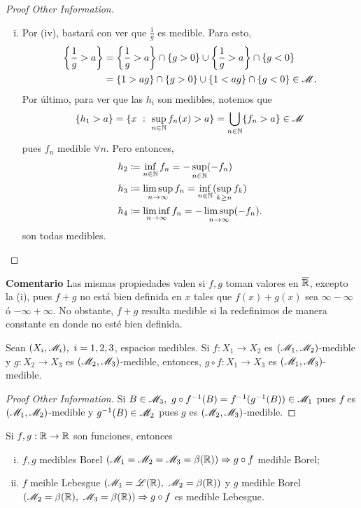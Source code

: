 \begin{proof}[Proof Other Information]
\begin{enumerate}[i)]
		\item Por (iv), bastará  con ver que $\frac{1}{g}$ es medible. Para esto,
		\begin{align*}
			\left\{\frac{1}{g} > a\right\} &= \left\{\frac{1}{g}>a\right\} \cap \{g>0\} \cup \left\{\frac{1}{g}>a\right\} \cap \{g<0\} \\
			&= \{1 > ag\} \cap \{g>0\} \cup \{1<ag\} \cap \{g<0\} \in \mathscr{M}
		.\end{align*}
		Por último, para ver que las $h_i$ son medibles, notemos que
		\[ \{h_{1}>a\} = \{x \ : \ \sup_{n\in\mathbb{N}} f_n(x) > a\} = \bigcup_{n\in\mathbb{N}} \{f_n > a\} \in \mathscr{M} \]
		pues $f_n$ medible $\forall n$. Pero entonces,
		\begin{align*}
			h_{2} &\coloneq \inf_{n\in\mathbb{N}} f_n = -\sup_{n\in\mathbb{N}}(-f_n) \\
			h_{3} &\coloneq \limsup_{n \to \infty} f_n = \inf_{n\in\mathbb{N}}(\sup_{k\geq n} f_k) \\
			h_{4} &\coloneq \liminf_{n \to \infty} f_n = -\limsup_{n \to \infty} (-f_n)
		.\end{align*}
		son todas medibles.
	\end{enumerate}
\end{proof}

\textbf{Comentario} Las mismas propiedades valen si $f,g$ toman valores en $\overline{\mathbb{R}}$, excepto la (i), pues $f+g$ no está bien definida en $x$ tales que $f(x) + g(x)$ sea $\infty-\infty$ ó $-\infty+\infty$. No obstante, $f+g$ resulta medible si la redefinimos de manera constante en donde no esté bien definida.

\begin{prop}
	Sean $(X_i, \mathscr{M}_i),\ i = 1,2,3$, espacios medibles. Si $f : X_{1} \to X_{2}$ es $(\mathscr{M}_{1}, \mathscr{M}_2)$-medible y $g : X_{2} \to X_{3}$ es $(\mathscr{M}_2, \mathscr{M}_3)$-medible, entonces, $g \circ f : X_{1} \to X_{3}$ es $(\mathscr{M}_1, \mathscr{M}_3)$-medible.
\end{prop}
\begin{proof}[Proof Other Information]
	Si $B \in \mathscr{M}_3,\ g \circ f^{-1}(B) = f^{-1}(g^{-1}(B)) \in \mathscr{M}_1$ pues $f$ es $(\mathscr{M}_1, \mathscr{M}_2)$-medible y $g^{-1}(B) \in \mathscr{M}_2$ pues $g$ es $(\mathscr{M}_2,\mathscr{M}_3)$-medible.
\end{proof}

\begin{corollary}
	Si $f,g : \mathbb{R} \to \mathbb{R}$ son funciones, entonces
	\begin{enumerate}[i)]
		\item $f,g$ medibles Borel $(\mathscr{M}_1 = \mathscr{M}_2 = \mathscr{M}_3 = \beta(\mathbb{R})) \Rightarrow g\circ f$ medible Borel;

		\item $f$ meible Lebesgue $(\mscr{M}_1 = \mscr{L}(\R),\ \mscr{M}_2 = \beta(\R))$ y $g$ medible Borel $(\mscr{M}_2 = \beta(\R),\ \mscr{M}_3 = \beta(\R)) \implies g \circ f$ es medible Lebesgue.
	\end{enumerate}
\end{corollary}

